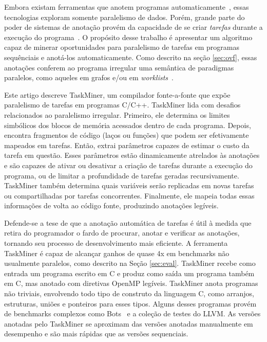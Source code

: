 \documentclass[sigconf]{acmart}
\newcommand\Taskminer{\mbox{\textsf{TaskMiner}}}
\begin{document}
Embora existam ferramentas que anotem programas automaticamente~\cite{Mendonca16,Pingali11},
essas tecnologias exploram somente paralelismo de dados.  Porém, grande
parte do poder de sistemas de anotação provém da capacidade de se criar \textit{tarefas}
durante a execução do programa~\cite{Ayguade09}. O propósito desse trabalho
é apresentar um algoritmo capaz de minerar oportunidades para paralelismo de tarefas
em programas sequênciais e anotá-los automaticamente. Como descrito na seção \ref{sec:ovf},
essas anotações conferem ao programa irregular uma semântica de paradigmas paralelos,
como aqueles em grafos e/ou em \textit{worklists}~\cite{Pingali11}.

Este artigo descreve {\Taskminer}, um compilador fonte-a-fonte que expõe
paralelismo de tarefas em programas C/C++. {\Taskminer} lida com desafios 
relacionados ao paralelismo irregular. Primeiro, ele determina os limites
simbólicos dos blocos de memória acessados dentro de cada programa. Depois, encontra 
fragmentos de código (laços ou funções) que podem 
ser efetivamente mapeados em tarefas. Então, extrai parâmetros capazes
de estimar o custo da tarefa em questão. Esses parâmetros estão dinamicamente atrelados
às anotações e são capazes de ativar ou desativar a criação de tarefas durante a execução do programa,
ou de limitar a profundidade de tarefas geradas recursivamente. \Taskminer{} também determina
quais variáveis serão replicadas em novas tarefas ou compartilhadas por tarefas concorrentes.
Finalmente, ele mapeia todas essas informações de volta ao código fonte, produzindo
anotações legíveis.

Defende-se a tese de que a anotação automática de tarefas é útil à medida que
retira do programador o fardo de procurar, anotar e verificar as anotações, tornando seu
processo de desenvolvimento mais eficiente. A ferramenta {\Taskminer} é capaz
de alcançar ganhos de quase 4x em benchmarks não usualmente paralelos, como descrito na Seção \ref{sec:eval}. {\Taskminer}
recebe como entrada um programa escrito em C e produz como saída um programa também em C,
mas anotado com diretivas OpenMP legíveis. {\Taskminer} anota programas não triviais, envolvendo
todo tipo de construto da linguagem C, como arranjos, estruturas, uniões e ponteiros para esses tipos.
Alguns desses programas provém de benchmarks complexos como Bots~\cite{Duran09}  e a coleção de testes do LLVM.
As versões anotadas pelo {\Taskminer} se aproximam das versões anotadas manualmente em
desempenho e são mais rápidas que as versões sequenciais.
\end{document}
